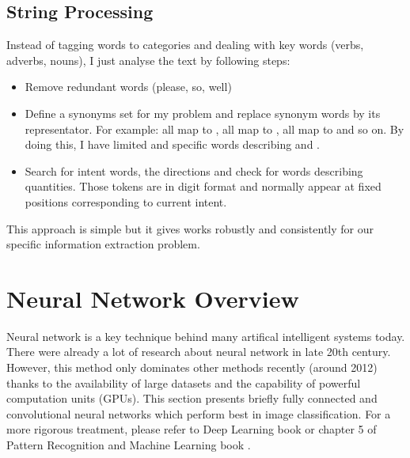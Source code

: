 \subsection{String Processing}
Instead of tagging words to categories and dealing with key words (verbs, adverbs, nouns), I just analyse the text by following steps:
\begin{itemize}
	\item Remove redundant words (please, so, well)
	\item Define a synonyms set for my problem and replace synonym words by its representator. For example:  all map to ,  all map to ,  all map to  and so on. By doing this, I have limited and specific words describing  and .
	\item Search for intent words, the directions and check for words describing quantities. Those tokens are in digit format and normally appear at fixed positions corresponding to current intent.
\end{itemize}

This approach is simple but it gives works robustly and consistently for our specific information extraction problem.

\section{Neural Network Overview}
\label{sec:neuralNet}
Neural network is a key technique behind many artifical intelligent systems today. There were already a lot of research about neural network in late 20th century. However, this method only dominates other methods recently (around 2012) thanks to the availability of large datasets and the capability of powerful computation units (GPUs). This section presents briefly fully connected and convolutional neural networks which perform best in image classification. For a more rigorous treatment, please refer to Deep Learning book \cite{Goodfellow-et-al-2016} or chapter 5 of Pattern Recognition and Machine Learning book \cite{Bishop:2006:PRM:1162264}.
